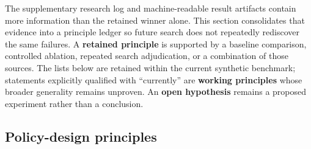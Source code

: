 \documentclass[11pt]{article}
\newcommand{\important}[1]{\textbf{\color{navy}#1}}
\newcommand{\risk}[1]{\textbf{\color{red}#1}}
\begin{document}
The supplementary research log and machine-readable result artifacts contain more
information than the retained winner alone.  This section consolidates that evidence into a
principle ledger so future search does not repeatedly rediscover the same failures.  A
\important{retained principle} is supported by a baseline comparison, controlled
ablation, repeated search adjudication, or a combination of those sources.  The lists
below are retained within the current synthetic benchmark; statements explicitly
qualified with ``currently'' are \important{working principles} whose broader
generality remains unproven.  An \risk{open hypothesis} remains a proposed experiment
rather than a conclusion.

\subsection{Policy-design principles}
\end{document}
